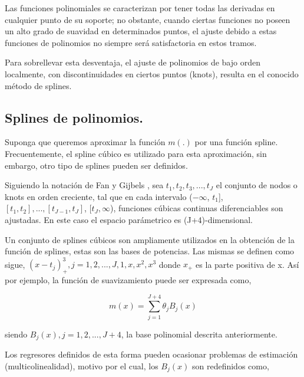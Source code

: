 \hspace*{0.4 cm} Las funciones polinomiales se caracterizan por tener todas las derivadas en cualquier punto de su soporte; no obstante, cuando ciertas funciones no poseen un alto grado de suavidad en determinados puntos, el ajuste debido a estas funciones de polinomios no siempre ser\'a satisfactoria en estos tramos.

\hspace*{0.4 cm} Para sobrellevar esta desventaja, el ajuste de polinomios de bajo orden localmente, con discontinuidades en ciertos puntos (knots), resulta en el conocido m\'etodo de splines.

\subsection{Splines de polinomios.\\}


\hspace*{0.4 cm}Suponga que queremos aproximar la funci\'on $m(.)$ por una funci\'on spline. Frecuentemente, el spline c\'ubico es utilizado para esta aproximaci\'on, sin embargo, otro tipo de splines pueden ser definidos.


\hspace*{0.4 cm}Siguiendo la notaci\'on de Fan y Gijbels \cite{FG}, sea $t_{1}, t_{2}, t_{3},...,t_{J}$ el conjunto de nodos o knots en orden creciente, tal que en cada intervalo  ($-\infty$, $t_{1}$], $[t_{1}, t_{2}],..., [t_{J-1}, t_{J}]$, [$t_{J}, \infty$), funciones c\'ubicas continuas diferenciables son ajustadas. En este caso el espacio par\'ametrico es (J+4)-dimensional.

\hspace*{0.4 cm} Un conjunto de splines c\'ubicos son ampliamente utilizados en la obtenci\'on de la funci\'on de splines, estas son las bases de potencias. Las mismas se definen como sigue, $(x- t_{j})_{+}^{3}, j= 1,2,...,J,1,x,x^2,x^3$ donde $x_{+}$ es la parte positiva de x. As\'i por ejemplo, la funci\'on de suavizamiento puede ser expresada como,

\begin{equation}
m(x) = \sum_{j=1}^{J+4} \theta_{j}B_{j}(x) 
\label{bases}
\end{equation}

\noindent siendo $B_{j}(x), j = 1, 2,... , J+4$, la base polinomial descrita anteriormente.

\hspace*{0.4 cm} Los regresores definidos de esta forma pueden ocasionar problemas de estimaci\'on (multicolinealidad), motivo por el cual, los $B_{j}(x)$ son
redefinidos como,


